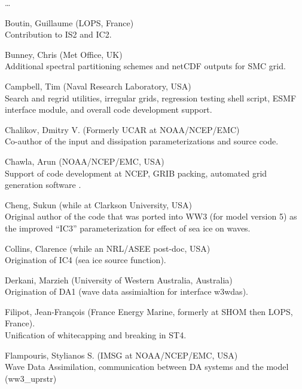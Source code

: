 \begin{list}{\ldots}{ }
\item [Boutin, Guillaume] (LOPS, France) \\
  Contribution to IS2 and IC2. 

\item [Bunney, Chris] (Met Office, UK) \\
Additional spectral partitioning schemes and netCDF outputs for SMC grid.

\item [Campbell, Tim] (Naval Research Laboratory, USA)\\ 
  Search and regrid utilities, irregular grids, regression testing shell script, ESMF interface module, 
  and overall code development support.

\item [Chalikov, Dmitry V.] (Formerly UCAR at NOAA/NCEP/EMC) \\ Co-author of the
  \cite{tol:JPO96} input and dissipation parameterizations and source code.

\item [Chawla, Arun](NOAA/NCEP/EMC, USA) \\
  Support of code development at NCEP, GRIB packing, automated grid generation
  software \citep{tol:MMAB07a, tol:OMOD08a}.

\item [Cheng, Sukun] (while at Clarkson University, USA) \\
  Original author of the code that was ported into WW3 (for model version 5) as the improved ``IC3'' parameterization for effect of sea ice on waves.

\item [Collins, Clarence] (while an NRL/ASEE post-doc, USA) \\
  Origination of IC4 (sea ice source function).

\item [Derkani, Marzieh] (University of Western Australia, Australia) \\
  Origination of DA1 (wave data assimialtion for interface {\F w3wdas}).

\item [Filipot, Jean-Fran{\c c}ois] (France Energy Marine, formerly at SHOM then LOPS, France).\\
  Unification of whitecapping and breaking in ST4. 

\item [Flampouris, Stylianos S.] (IMSG at NOAA/NCEP/EMC, USA) \\
      Wave Data Assimilation, communication between DA systems and the model (ww3\_uprstr) 


\end{list}
